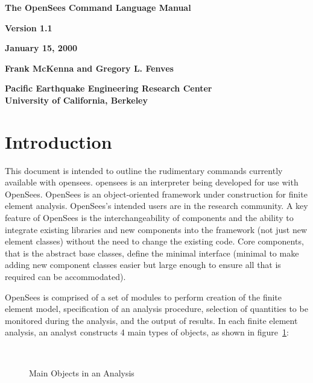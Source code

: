 \documentclass[12pt]{article}
\begin{document}


\begin{center}
{\bf \Large The OpenSees Command Language Manual} 

{\bf Version 1.1} 

{\bf  January 15, 2000} 

{\bf  Frank McKenna and Gregory L. Fenves} 

{\bf  Pacific Earthquake Engineering Research Center \\
      University of California, Berkeley}
\end{center}

\vspace{.2in}
\section{Introduction}
This document is intended to outline the rudimentary commands
currently available with opensees. opensees is an interpreter being developed for
use with OpenSees. OpenSees is an object-oriented framework under construction for
finite element analysis. OpenSees's intended users are in the research
community. A key feature of OpenSees is the interchangeability of components
and the ability to integrate existing libraries and new components
into the framework (not just new element classes) without the need to
change the existing code. Core components, that is the abstract base
classes, define the minimal interface (minimal to make adding new
component classes easier but large enough to ensure all that is
required can be accommodated). 

OpenSees is comprised of a set of modules to perform creation of the finite 
element model, specification of an analysis procedure, selection
of quantities to be monitored during the analysis, and the output of
results. In each finite element analysis, an analyst constructs 4 main
types of objects, as shown in figure~\ref{main}:


\begin{figure}[htpb]
\begin{center}
\leavevmode
\hbox{%
}
\end{center}
\caption{Main Objects in an Analysis}
\label{main}
\end{figure}
\end{document}
